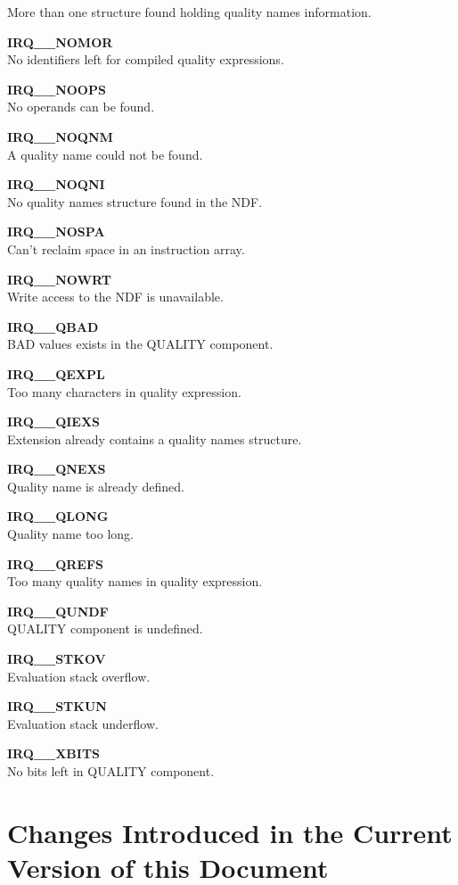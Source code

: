 \begin{description}
More than one structure found holding quality names information.
\item {\bf IRQ\_\_NOMOR}\\
No identifiers left for compiled quality expressions.
\item {\bf IRQ\_\_NOOPS}\\ 
No operands can be found.
\item {\bf IRQ\_\_NOQNM}\\ 
A quality name could not be found.
\item {\bf IRQ\_\_NOQNI}\\ 
No quality names structure found in the NDF.
\item {\bf IRQ\_\_NOSPA}\\ 
Can't reclaim space in an instruction array.
\item {\bf IRQ\_\_NOWRT}\\ 
Write access to the NDF is unavailable.
\item {\bf IRQ\_\_QBAD }\\ 
BAD values exists in the QUALITY component.
\item {\bf IRQ\_\_QEXPL}\\ 
Too many characters in quality expression.
\item {\bf IRQ\_\_QIEXS}\\ 
Extension already contains a quality names structure.
\item {\bf IRQ\_\_QNEXS}\\ 
Quality name is already defined.
\item {\bf IRQ\_\_QLONG}\\ 
Quality name too long.
\item {\bf IRQ\_\_QREFS}\\ 
Too many quality names in quality expression.
\item {\bf IRQ\_\_QUNDF}\\ 
QUALITY component is undefined.
\item {\bf IRQ\_\_STKOV}\\ 
Evaluation stack overflow.
\item {\bf IRQ\_\_STKUN}\\ 
Evaluation stack underflow.
\item {\bf IRQ\_\_XBITS}\\ 
No bits left in QUALITY component.
\end{description}

\section {Changes Introduced in the Current Version of this Document}
\label {SEC:CHANGES}

